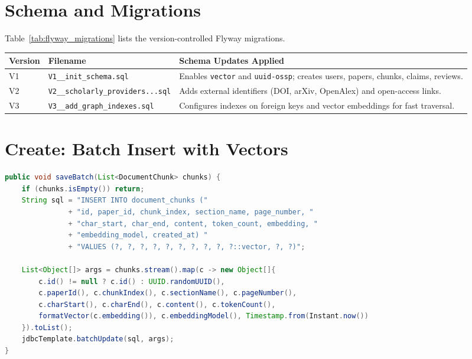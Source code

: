 \documentclass[11pt,a4paper,titlepage]{report}
\begin{document}
\section{Schema and Migrations}
Table~\ref{tab:flyway_migrations} lists the version-controlled Flyway migrations.

\begin{center}
\label{tab:flyway_migrations}
\vspace{3pt}
\begin{tabularx}{\textwidth}{llX}
\toprule
\textbf{Version} & \textbf{Filename} & \textbf{Schema Updates Applied} \\
\midrule
V1 & \texttt{V1\_\_init\_schema.sql} & Enables \texttt{vector} and \texttt{uuid-ossp}; creates users, papers, chunks, claims, reviews. \\
V2 & \texttt{V2\_\_scholarly\_providers...sql} & Adds external identifiers (DOI, arXiv, OpenAlex) and open-access links. \\
V3 & \texttt{V3\_\_add\_graph\_indexes.sql} & Configures indexes on foreign keys and vector embeddings for fast traversal. \\
\bottomrule
\end{tabularx}
\end{center}

\section{Create: Batch Insert with Vectors}
\begin{lstlisting}[language=Java, caption={Batch Insert Operation with Vector Cast}]
public void saveBatch(List<DocumentChunk> chunks) {
    if (chunks.isEmpty()) return;
    String sql = "INSERT INTO document_chunks ("
               + "id, paper_id, chunk_index, section_name, page_number, "
               + "char_start, char_end, content, token_count, embedding, "
               + "embedding_model, created_at) "
               + "VALUES (?, ?, ?, ?, ?, ?, ?, ?, ?, ?::vector, ?, ?)";

    List<Object[]> args = chunks.stream().map(c -> new Object[]{
        c.id() != null ? c.id() : UUID.randomUUID(),
        c.paperId(), c.chunkIndex(), c.sectionName(), c.pageNumber(),
        c.charStart(), c.charEnd(), c.content(), c.tokenCount(),
        formatVector(c.embedding()), c.embeddingModel(), Timestamp.from(Instant.now())
    }).toList();
    jdbcTemplate.batchUpdate(sql, args);
}
\end{lstlisting}
\end{document}
